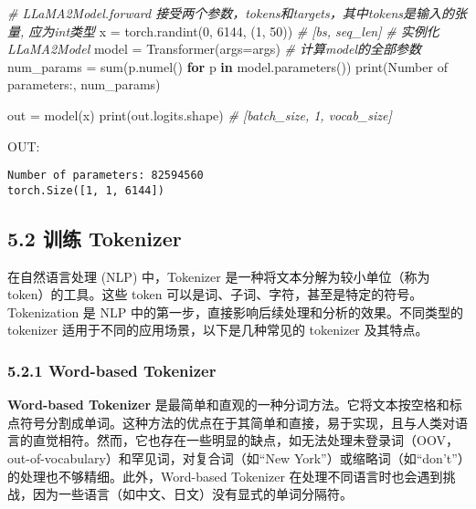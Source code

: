\documentclass[
]{article}
\newenvironment{Shaded}{}{}
\newcommand{\BuiltInTok}[1]{\textcolor[rgb]{0.00,0.50,0.00}{#1}}
\newcommand{\CommentTok}[1]{\textcolor[rgb]{0.38,0.63,0.69}{\textit{#1}}}
\newcommand{\ControlFlowTok}[1]{\textcolor[rgb]{0.00,0.44,0.13}{\textbf{#1}}}
\newcommand{\DecValTok}[1]{\textcolor[rgb]{0.25,0.63,0.44}{#1}}
\newcommand{\KeywordTok}[1]{\textcolor[rgb]{0.00,0.44,0.13}{\textbf{#1}}}
\newcommand{\NormalTok}[1]{#1}
\newcommand{\OperatorTok}[1]{\textcolor[rgb]{0.40,0.40,0.40}{#1}}
\newcommand{\StringTok}[1]{\textcolor[rgb]{0.25,0.44,0.63}{#1}}
\begin{document}
\begin{Shaded}
\begin{Highlighting}[]
\CommentTok{\# LLaMA2Model.forward 接受两个参数，tokens和targets，其中tokens是输入的张量, 应为int类型}
\NormalTok{x }\OperatorTok{=}\NormalTok{ torch.randint(}\DecValTok{0}\NormalTok{, }\DecValTok{6144}\NormalTok{, (}\DecValTok{1}\NormalTok{, }\DecValTok{50}\NormalTok{)) }\CommentTok{\# [bs, seq\_len]}
\CommentTok{\# 实例化LLaMA2Model}
\NormalTok{model }\OperatorTok{=}\NormalTok{ Transformer(args}\OperatorTok{=}\NormalTok{args)}
\CommentTok{\# 计算model的全部参数}
\NormalTok{num\_params }\OperatorTok{=} \BuiltInTok{sum}\NormalTok{(p.numel() }\ControlFlowTok{for}\NormalTok{ p }\KeywordTok{in}\NormalTok{ model.parameters())}
\BuiltInTok{print}\NormalTok{(}\StringTok{\textquotesingle{}Number of parameters:\textquotesingle{}}\NormalTok{, num\_params)}

\NormalTok{out }\OperatorTok{=}\NormalTok{ model(x)}
\BuiltInTok{print}\NormalTok{(out.logits.shape) }\CommentTok{\# [batch\_size, 1, vocab\_size]}
\end{Highlighting}
\end{Shaded}

OUT:

\begin{verbatim}
Number of parameters: 82594560
torch.Size([1, 1, 6144])
\end{verbatim}

\subsection{5.2 训练 Tokenizer}\label{ux8badux7ec3-tokenizer}

在自然语言处理 (NLP) 中，Tokenizer 是一种将文本分解为较小单位（称为
token）的工具。这些 token
可以是词、子词、字符，甚至是特定的符号。Tokenization 是 NLP
中的第一步，直接影响后续处理和分析的效果。不同类型的 tokenizer
适用于不同的应用场景，以下是几种常见的 tokenizer 及其特点。

\subsubsection{5.2.1 Word-based Tokenizer}\label{word-based-tokenizer}

\textbf{Word-based Tokenizer}
是最简单和直观的一种分词方法。它将文本按空格和标点符号分割成单词。这种方法的优点在于其简单和直接，易于实现，且与人类对语言的直觉相符。然而，它也存在一些明显的缺点，如无法处理未登录词（OOV，out-of-vocabulary）和罕见词，对复合词（如``New
York''）或缩略词（如``don't''）的处理也不够精细。此外，Word-based
Tokenizer
在处理不同语言时也会遇到挑战，因为一些语言（如中文、日文）没有显式的单词分隔符。
\end{document}
